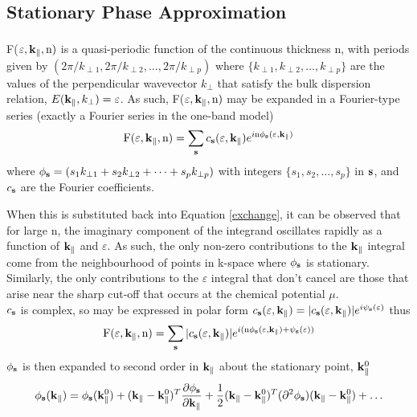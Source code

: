 \documentclass[a4paper, 12pt]{article}
\newcommand{\site}[1]{\textsuperscript{\textcolor{blue}{\cite{#1}}}}
\begin{document}
	\subsection{Stationary Phase Approximation}
	F($\varepsilon, \rm \bf k_\parallel, \rm n)$ is a quasi-periodic function of the continuous thickness n\site{rev3}, with periods given by $\left(2\pi/k_{\perp 1}, 2\pi/k_{\perp 2}, \dots, 2\pi/k_{\perp p}\right)$ where $\{k_{\perp 1}, k_{\perp 2}, \dots, k_{\perp p}\}$ are the values of the perpendicular wavevector $k_\perp$ that satisfy the bulk dispersion relation, $E({\bf k}_\parallel, k_\perp) = \varepsilon$. As such, F($\varepsilon, \rm \bf k_\parallel, \rm n)$ may be expanded in a Fourier-type series (exactly a Fourier series in the one-band model)
\begin{equation}
	\rm F(\varepsilon, \bf k_\parallel, \rm n) = \sum_{\bf s} \mathnormal{c_{\bf s}(\varepsilon, {\bf k}_\parallel) e^{i\rm n \phi_{\bf s}(\varepsilon, \bf k_\parallel)}}
\end{equation}
where $\phi_{\bf s} = (s_1k_{\perp 1} + s_2k_{\perp 2} + \dots + s_pk_{\perp p})$ with integers $\{s_1, s_2, \dots, s_p\}$ in ${\bf s}$, and $c_{\bf s}$ are the Fourier coefficients.
\\\par
 When this is substituted back into Equation \eqref{exchange}, it can be observed that for large n, the imaginary component of the integrand oscillates rapidly as a function of $\rm \bf k_\parallel$ and $\varepsilon$. As such, the only non-zero contributions to the $\rm \bf k_\parallel$ integral come from the neighbourhood of points in k-space where $\phi_{\bf s}$ is stationary. Similarly, the only contributions to the $\varepsilon$ integral that don't cancel are those that arise near the sharp cut-off that occurs at the chemical potential $\mu$.
\\[3mm]
$c_{\bf s}$ is complex, so may be expressed in polar form $c_{\bf s}(\varepsilon, {\bf k_\parallel)} = |c_{\bf s}(\varepsilon,{\bf k_\parallel)}|e^{i \psi_{\bf s} (\varepsilon)}$ thus
\begin{equation}
	\rm F(\varepsilon, \bf k_\parallel, \rm n) = \sum_{\bf s} \mathnormal{|c_{\bf s}(\varepsilon, {\bf k_\parallel)}| e^{i\rm (n \phi_{\bf s}(\varepsilon, {\bf k_\parallel})+ \psi_{\bf s}(\varepsilon))}}
\end{equation}
$\phi_{\bf s}$ is then expanded to second order in $\bf k_\parallel$ about the stationary point, ${\bf k}_\parallel^0$
\begin{multline}
	\phi_{\bf s}({\bf k_\parallel}) = \phi_{\bf s}({\bf k}_\parallel^0) + ({\bf k}_\parallel - {\bf k}_\parallel^0)^T\frac{\partial \phi_{\bf s}}{\partial{\bf k}_\parallel }+ \frac{1}{2}({\bf k}_\parallel - {\bf k}_\parallel^0)^T(\partial^2\phi_{\bf s}) ({\bf k}_\parallel - {\bf k}_\parallel^0) + \dots
\end{multline}
\end{document}
